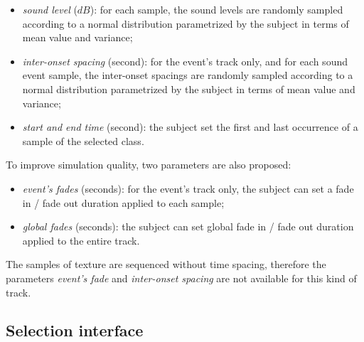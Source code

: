 \documentclass[12pt]{elsarticle}
\begin{document}
\begin{itemize}
\item \emph{sound level} ($dB$): for each sample, the sound levels are randomly sampled according to a normal distribution parametrized by the subject in terms of mean value and variance;
\item \emph{inter-onset spacing} (second): for the event's track only, and for each sound event sample, the inter-onset spacings are randomly sampled according to a normal distribution parametrized by the subject in terms of mean value and variance;
\item \emph{start and end time} (second): the subject set the first and last occurrence of a sample of the selected class.
\end{itemize}


To improve simulation quality, two parameters are also proposed:


\begin{itemize}
\item \emph{event's fades} (seconds): for the event's track only, the subject can set a fade in / fade out duration applied to each sample;
\item \emph{global fades} (seconds): the subject can set global fade in / fade out duration applied to the entire track.
\end{itemize}


The samples of texture are sequenced without time spacing, therefore the parameters \emph{event's fade} and \emph{inter-onset spacing} are not available for this kind of track.

\subsection{Selection interface}
\label{sec:simscene_ssf}
\end{document}
